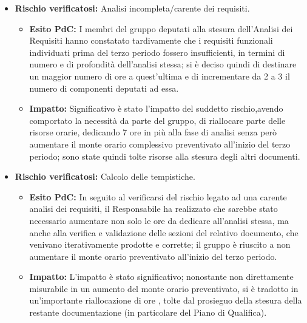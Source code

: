 \begin{itemize}
\item \textbf{Rischio verificatosi:} Analisi incompleta/carente dei requisiti.
\begin{itemize}
\item \textbf{Esito PdC:} I membri del gruppo deputati alla stesura dell'Analisi dei Requisiti hanno constatato tardivamente
che i requisiti funzionali individuati prima del terzo periodo fossero insufficienti, in termini di numero e di 
profondità dell'analisi stessa; si è deciso quindi di destinare un maggior numero di ore a quest'ultima e di incrementare da
 2 a 3 il numero di componenti deputati ad essa. \\
\item \textbf{Impatto:} Significativo è stato l'impatto del suddetto rischio,avendo comportato la necessità
da parte del gruppo, di riallocare parte delle risorse orarie, dedicando 7 ore in più alla fase di analisi senza però
aumentare il monte orario complessivo preventivato all'inizio del terzo periodo; sono state
quindi tolte risorse alla stesura degli altri documenti.\\
\end{itemize}

\item \textbf{Rischio verificatosi:} Calcolo delle tempistiche.\\
\begin{itemize}
\item \textbf{Esito PdC:} In seguito al verificarsi del rischio legato ad una carente analisi dei requisiti, il Responsabile ha realizzato
che sarebbe stato necessario aumentare non solo le ore da dedicare all'analisi stessa, ma anche alla verifica e 
validazione delle sezioni del relativo documento, che venivano iterativamente prodotte e corrette; il gruppo è riuscito  a non aumentare
il monte orario preventivato all'inizio del terzo periodo. \\
\item \textbf{Impatto:} L'impatto è stato significativo; nonostante non direttamente misurabile in un aumento del monte orario preventivato,
si è tradotto in un'importante riallocazione di ore , tolte dal prosieguo della stesura della restante documentazione (in particolare del Piano
di Qualifica).
\end{itemize}


\end{itemize}
